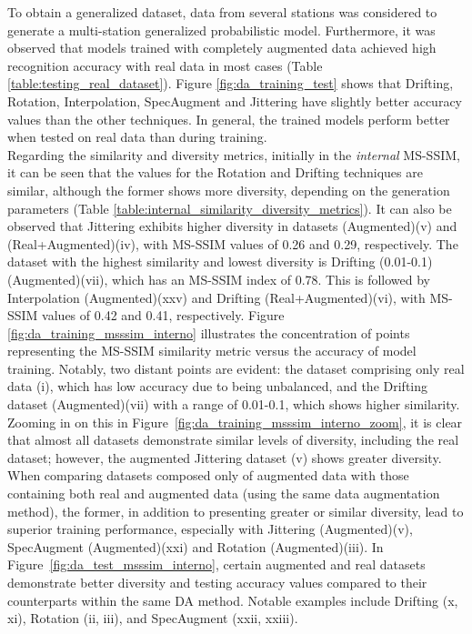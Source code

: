 \documentclass[lettersize,journal]{IEEEtran}
\begin{document}
To obtain a generalized dataset, data from several stations was considered to generate a multi-station generalized probabilistic model. Furthermore, it was observed that models trained with completely augmented data achieved high recognition accuracy with real data in most cases (Table \ref{table:testing_real_dataset}).
Figure \ref{fig:da_training_test} shows that Drifting, Rotation, Interpolation, SpecAugment and Jittering have slightly better accuracy values than the other techniques. In general, the trained models perform better when tested on real data than during training. \\

Regarding the similarity and diversity metrics, initially in the \textit{internal} MS-SSIM, it can be seen that the values for the Rotation and Drifting techniques are similar, although the former shows more diversity, depending on the generation parameters (Table \ref{table:internal_similarity_diversity_metrics}).
It can also be observed that Jittering exhibits higher diversity in datasets (Augmented)(v) and (Real+Augmented)(iv), with MS-SSIM values of 0.26 and 0.29, respectively.
The dataset with the highest similarity and lowest diversity is Drifting (0.01-0.1)(Augmented)(vii), which has an MS-SSIM index of 0.78. This is followed by Interpolation (Augmented)(xxv) and Drifting (Real+Augmented)(vi), with MS-SSIM values of 0.42 and 0.41, respectively.
Figure \ref{fig:da_training_msssim_interno} illustrates the concentration of points representing the MS-SSIM similarity metric versus the accuracy of model training. Notably, two distant points are evident: the dataset comprising only real data (i), which has low accuracy due to being unbalanced, and the Drifting dataset (Augmented)(vii) with a range of 0.01-0.1, which shows higher similarity. Zooming in on this in Figure~\ref{fig:da_training_msssim_interno_zoom}, it is clear that almost all datasets demonstrate similar levels of diversity, including the real dataset; however, the augmented Jittering dataset (v) shows greater diversity.
When comparing datasets composed only of augmented data with those containing both real and augmented data (using the same data augmentation method), the former, in addition to presenting greater or similar diversity, lead to superior training performance, especially with Jittering (Augmented)(v), SpecAugment (Augmented)(xxi) and Rotation (Augmented)(iii).
In Figure~\ref{fig:da_test_msssim_interno}, certain augmented and real datasets demonstrate better diversity and testing accuracy values compared to their counterparts within the same DA method. Notable examples include Drifting (x, xi), Rotation (ii, iii), and SpecAugment (xxii, xxiii).\\
\end{document}
